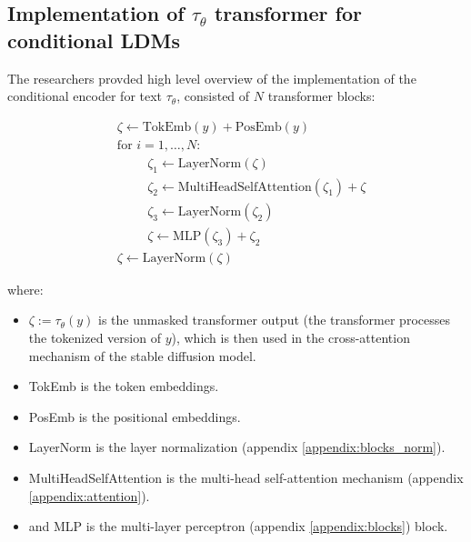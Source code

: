 \subsection{Implementation of $\tau_\theta$ transformer for conditional LDMs}

The researchers provded high level overview of the implementation of the conditional encoder for text $\tau_\theta$, consisted of $N$ transformer blocks:

\begin{align*}
    &\zeta \leftarrow \text{TokEmb}(y) + \text{PosEmb}(y) \\
    &\text{for } i = 1, \ldots, N : \\
        &\hspace{1cm} \zeta_1 \leftarrow \text{LayerNorm}(\zeta) \\
        &\hspace{1cm} \zeta_2 \leftarrow \text{MultiHeadSelfAttention}(\zeta_1) + \zeta \\
        &\hspace{1cm} \zeta_3 \leftarrow \text{LayerNorm}(\zeta_2) \\
        &\hspace{1cm} \zeta \leftarrow \text{MLP}(\zeta_3) + \zeta_2 \\
    &\zeta \leftarrow \text{LayerNorm}(\zeta)
\end{align*}

where:

\begin{itemize}
    \item $\zeta := \tau_\theta(y)$ is the unmasked transformer output (the transformer processes the tokenized version of $y$), which is then used in the cross-attention mechanism of the stable diffusion model.
    \item TokEmb is the token embeddings.
    \item PosEmb is the positional embeddings.
    \item LayerNorm is the layer normalization (appendix \ref{appendix:blocks_norm}).
    \item MultiHeadSelfAttention is the multi-head self-attention mechanism (appendix \ref{appendix:attention}).
    \item and MLP is the multi-layer perceptron (appendix \ref{appendix:blocks}) block.
\end{itemize}


